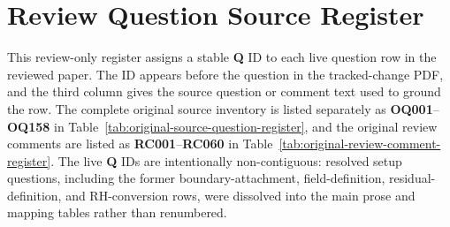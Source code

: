\ifreviewchanges
\clearpage
\chapter*{Review Question Source Register}
\footnotesize
\renewcommand{\arraystretch}{1.12}
This review-only register assigns a stable \textbf{Q} ID to each live question row
in the reviewed paper.  The ID appears before the question in the tracked-change
PDF, and the third column gives the source question or comment text used to ground
the row.  The complete original source inventory is listed separately as
\textbf{OQ001}--\textbf{OQ158} in Table~\ref{tab:original-source-question-register},
and the original review comments are listed as \textbf{RC001}--\textbf{RC060} in
Table~\ref{tab:original-review-comment-register}.  The live \textbf{Q} IDs are
intentionally non-contiguous: resolved setup questions, including the former
boundary-attachment, field-definition, residual-definition, and RH-conversion rows,
were dissolved into the main prose and mapping tables rather than renumbered.\par\medskip
